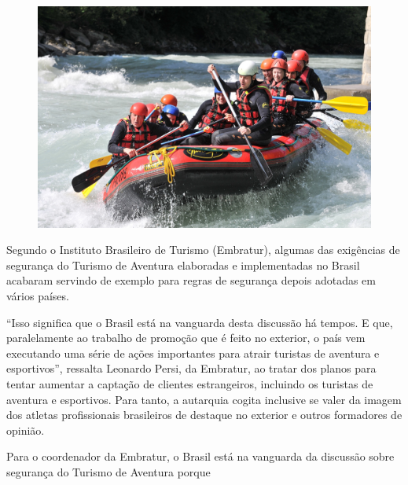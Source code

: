 \begin{myquote}

\begin{figure}[H]
\centering
\includegraphics[width=\textwidth]{./imgSAEB_7_POR/media/image40.png}
\end{figure}

Segundo o Instituto Brasileiro de Turismo (Embratur), algumas das exigências de
segurança do Turismo de Aventura elaboradas e implementadas no Brasil acabaram 
servindo de exemplo para regras de segurança depois adotadas em vários países.

``Isso significa que o Brasil está na vanguarda desta discussão há tempos. E
que, paralelamente ao trabalho de promoção que é feito no exterior, o país vem
executando uma série de ações importantes para atrair turistas de aventura e
esportivos'', ressalta Leonardo Persi, da Embratur, ao tratar dos planos para tentar
aumentar a captação de clientes estrangeiros, incluindo os turistas de
aventura e esportivos. Para tanto, a autarquia cogita inclusive se valer da
imagem dos atletas profissionais brasileiros de destaque no exterior e outros
formadores de opinião.

\end{myquote}

Para o coordenador da Embratur, o Brasil está na vanguarda da discussão sobre 
segurança do Turismo de Aventura porque 

